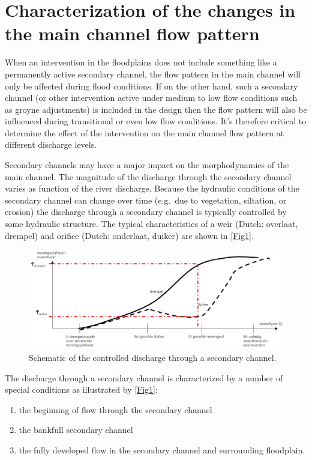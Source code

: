 \section{Characterization of the changes in the main channel flow pattern}

When an intervention in the floodplains does not include something like a permanently active secondary channel, the flow pattern in the main channel will only be affected during flood conditions.
If on the other hand, such a secondary channel (or other intervention active under medium to low flow conditions such as groyne adjustments) is included in the design then the flow pattern will also be influenced during transitional or even low flow conditions.
It's therefore critical to determine the effect of the intervention on the main channel flow pattern at different discharge levels.

Secondary channels may have a major impact on the morphodynamics of the main channel.
The magnitude of the discharge through the secondary channel varies as function of the river discharge.
Because the hydraulic conditions of the secondary channel can change over time (e.g.~due to vegetation, siltation, or erosion) the discharge through a secondary channel is typically controlled by some hydraulic structure.
The typical characteristics of a weir (Dutch: overlaat, drempel) and orifice (Dutch: onderlaat, duiker) are shown in \autoref{Fig1}.

\begin{figure}[b]
\includegraphics[width=\columnwidth]{figures/Fig1.png}
\caption{Schematic of the controlled discharge through a secondary channel.}
\label{Fig1}
\end{figure}

The discharge through a secondary channel is characterized by a number of special conditions as illustrated by \autoref{Fig1}:

\begin{enumerate}
\item the beginning of flow through the secondary channel
\item the bankfull secondary channel
\item the fully developed flow in the secondary channel and surrounding floodplain.
\end{enumerate}

